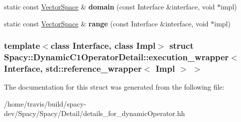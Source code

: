 \begin{DoxyCompactItemize}
\item 
\hypertarget{structSpacy_1_1DynamicC1OperatorDetail_1_1execution__wrapper_3_01Interface_00_01std_1_1reference__wrapper_3_01Impl_01_4_01_4_a2f244464475dd84ce08838406ea5bc8e}{static const \hyperlink{classSpacy_1_1VectorSpace}{\-Vector\-Space} \& {\bfseries domain} (const \-Interface \&interface, void $\ast$impl)}\label{structSpacy_1_1DynamicC1OperatorDetail_1_1execution__wrapper_3_01Interface_00_01std_1_1reference__wrapper_3_01Impl_01_4_01_4_a2f244464475dd84ce08838406ea5bc8e}

\item 
\hypertarget{structSpacy_1_1DynamicC1OperatorDetail_1_1execution__wrapper_3_01Interface_00_01std_1_1reference__wrapper_3_01Impl_01_4_01_4_adeefb43418d6fb3abc0765133be9b3af}{static const \hyperlink{classSpacy_1_1VectorSpace}{\-Vector\-Space} \& {\bfseries range} (const \-Interface \&interface, void $\ast$impl)}\label{structSpacy_1_1DynamicC1OperatorDetail_1_1execution__wrapper_3_01Interface_00_01std_1_1reference__wrapper_3_01Impl_01_4_01_4_adeefb43418d6fb3abc0765133be9b3af}

\end{DoxyCompactItemize}
\subsubsection*{template$<$class Interface, class Impl$>$ struct Spacy\-::\-Dynamic\-C1\-Operator\-Detail\-::execution\-\_\-wrapper$<$ Interface, std\-::reference\-\_\-wrapper$<$ Impl $>$ $>$}



\-The documentation for this struct was generated from the following file\-:\begin{DoxyCompactItemize}
\item 
/home/travis/build/spacy-\/dev/\-Spacy/\-Spacy/\-Detail/details\-\_\-for\-\_\-dynamic\-Operator.\-hh\end{DoxyCompactItemize}
